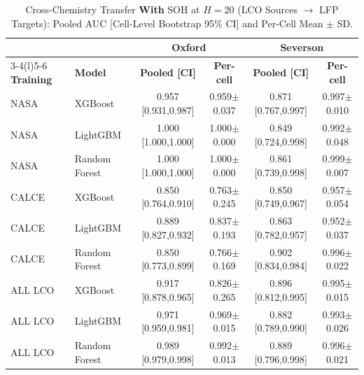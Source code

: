 \begin{table}[!t]
\caption{Cross-Chemistry Transfer \textbf{With} SOH at $H{=}20$ (LCO Sources $\to$ LFP Targets): Pooled AUC [Cell-Level Bootstrap 95\% CI] and Per-Cell Mean $\pm$ SD.}
\label{tab:crosswith}
\centering
\footnotesize
\begin{tabular}{llcccc}
\toprule
 & & \multicolumn{2}{c}{\textbf{Oxford}} & \multicolumn{2}{c}{\textbf{Severson}}\\
\cmidrule(lr){3-4}\cmidrule(l){5-6}
\textbf{Training} & \textbf{Model} & \textbf{Pooled [CI]} & \textbf{Per-cell} & \textbf{Pooled [CI]} & \textbf{Per-cell}\\
\midrule
NASA & XGBoost & 0.957 [0.931,0.987] & 0.959$\pm$0.037 & 0.871 [0.767,0.997] & 0.997$\pm$0.010 \\
NASA & LightGBM & 1.000 [1.000,1.000] & 1.000$\pm$0.000 & 0.849 [0.724,0.998] & 0.992$\pm$0.048 \\
NASA & Random Forest & 1.000 [1.000,1.000] & 1.000$\pm$0.000 & 0.861 [0.739,0.998] & 0.999$\pm$0.007 \\
CALCE & XGBoost & 0.850 [0.764,0.910] & 0.763$\pm$0.245 & 0.850 [0.749,0.967] & 0.957$\pm$0.054 \\
CALCE & LightGBM & 0.889 [0.827,0.932] & 0.837$\pm$0.193 & 0.863 [0.782,0.957] & 0.952$\pm$0.037 \\
CALCE & Random Forest & 0.850 [0.773,0.899] & 0.766$\pm$0.169 & 0.902 [0.834,0.984] & 0.996$\pm$0.022 \\
ALL LCO & XGBoost & 0.917 [0.878,0.965] & 0.826$\pm$0.265 & 0.896 [0.812,0.995] & 0.995$\pm$0.015 \\
ALL LCO & LightGBM & 0.971 [0.959,0.981] & 0.969$\pm$0.015 & 0.882 [0.789,0.990] & 0.993$\pm$0.026 \\
ALL LCO & Random Forest & 0.989 [0.979,0.998] & 0.992$\pm$0.013 & 0.889 [0.796,0.998] & 0.996$\pm$0.021 \\
\bottomrule
\end{tabular}
\end{table}


